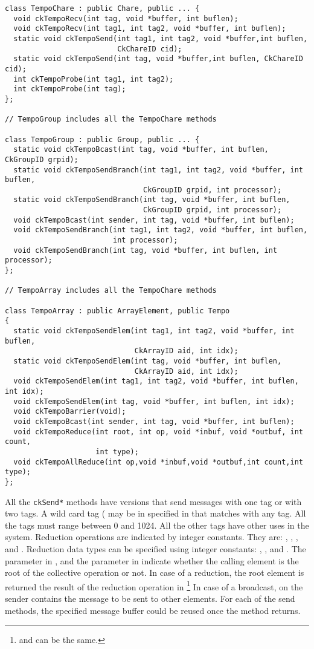 \begin{verbatim}
class TempoChare : public Chare, public ... {
  void ckTempoRecv(int tag, void *buffer, int buflen);
  void ckTempoRecv(int tag1, int tag2, void *buffer, int buflen);
  static void ckTempoSend(int tag1, int tag2, void *buffer,int buflen,
                          CkChareID cid);
  static void ckTempoSend(int tag, void *buffer,int buflen, CkChareID cid);
  int ckTempoProbe(int tag1, int tag2);
  int ckTempoProbe(int tag);
};

// TempoGroup includes all the TempoChare methods

class TempoGroup : public Group, public ... {
  static void ckTempoBcast(int tag, void *buffer, int buflen, CkGroupID grpid);
  static void ckTempoSendBranch(int tag1, int tag2, void *buffer, int buflen,
                                CkGroupID grpid, int processor);
  static void ckTempoSendBranch(int tag, void *buffer, int buflen,
                                CkGroupID grpid, int processor);
  void ckTempoBcast(int sender, int tag, void *buffer, int buflen);
  void ckTempoSendBranch(int tag1, int tag2, void *buffer, int buflen,
                         int processor);
  void ckTempoSendBranch(int tag, void *buffer, int buflen, int processor);
};

// TempoArray includes all the TempoChare methods

class TempoArray : public ArrayElement, public Tempo
{
  static void ckTempoSendElem(int tag1, int tag2, void *buffer, int buflen,
                              CkArrayID aid, int idx);
  static void ckTempoSendElem(int tag, void *buffer, int buflen,
                              CkArrayID aid, int idx);
  void ckTempoSendElem(int tag1, int tag2, void *buffer, int buflen, int idx);
  void ckTempoSendElem(int tag, void *buffer, int buflen, int idx);
  void ckTempoBarrier(void);
  void ckTempoBcast(int sender, int tag, void *buffer, int buflen);
  void ckTempoReduce(int root, int op, void *inbuf, void *outbuf, int count,
                     int type);
  void ckTempoAllReduce(int op,void *inbuf,void *outbuf,int count,int type);
};
\end{verbatim}

All the {\tt ckSend*} methods have versions that send messages with one tag or
with two tags. A wild card tag ( may be in specified in 
that matches with any tag. All the tags must range between 0 and 1024. All the other
tags have other uses in the system. Reduction operations are indicated by integer constants.
They are: , , , and .
Reduction data types can be specified using integer constants: ,
, and . The  parameter in ,
and the  parameter in  indicate whether the calling element
is the root of the collective operation or not. In case of a reduction,
the root element is returned the result of the reduction operation in
\footnote{ and  can be the same.} In case of a
broadcast,  on the sender contains the message to be sent to other elements.
For each of the send methods, the specified message buffer could be reused once
the method returns.

